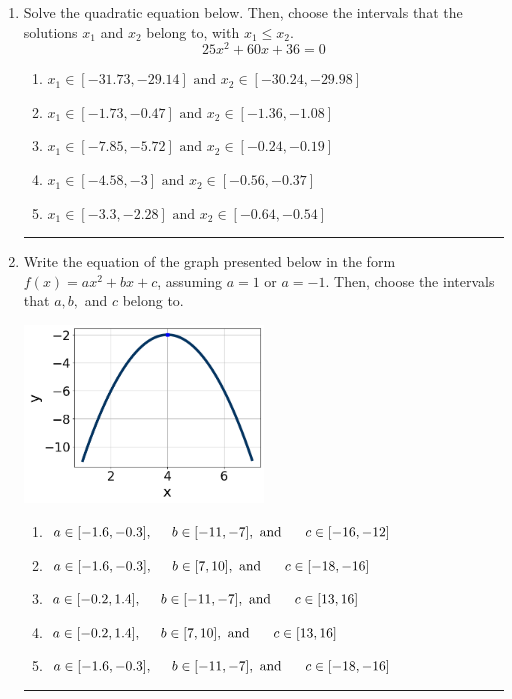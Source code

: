 \documentclass[14pt]{extbook}
\newcommand{\litem}[1]{\item#1\hspace*{-1cm}\rule{\textwidth}{0.4pt}}
\begin{document}
\begin{enumerate}
{\begin{enumerate}[label=\Alph*.]
\end{enumerate} }
\litem{
Solve the quadratic equation below. Then, choose the intervals that the solutions $x_1$ and $x_2$ belong to, with $x_1 \leq x_2$.\[ 25x^{2} +60 x + 36 = 0 \]\begin{enumerate}[label=\Alph*.]
\item \( x_1 \in [-31.73, -29.14] \text{ and } x_2 \in [-30.24, -29.98] \)
\item \( x_1 \in [-1.73, -0.47] \text{ and } x_2 \in [-1.36, -1.08] \)
\item \( x_1 \in [-7.85, -5.72] \text{ and } x_2 \in [-0.24, -0.19] \)
\item \( x_1 \in [-4.58, -3] \text{ and } x_2 \in [-0.56, -0.37] \)
\item \( x_1 \in [-3.3, -2.28] \text{ and } x_2 \in [-0.64, -0.54] \)

\end{enumerate} }
\litem{
Write the equation of the graph presented below in the form $f(x)=ax^2+bx+c$, assuming  $a=1$ or $a=-1$. Then, choose the intervals that $a, b,$ and $c$ belong to.
\begin{center}
    \includegraphics[width=0.5\textwidth]{../Figures/quadraticGraphToEquationCopyB.png}
\end{center}
\begin{enumerate}[label=\Alph*.]
\item \( a \in [-1.6, -0.3], \hspace*{5mm} b \in [-11, -7], \text{ and } \hspace*{5mm} c \in [-16, -12] \)
\item \( a \in [-1.6, -0.3], \hspace*{5mm} b \in [7, 10], \text{ and } \hspace*{5mm} c \in [-18, -16] \)
\item \( a \in [-0.2, 1.4], \hspace*{5mm} b \in [-11, -7], \text{ and } \hspace*{5mm} c \in [13, 16] \)
\item \( a \in [-0.2, 1.4], \hspace*{5mm} b \in [7, 10], \text{ and } \hspace*{5mm} c \in [13, 16] \)
\item \( a \in [-1.6, -0.3], \hspace*{5mm} b \in [-11, -7], \text{ and } \hspace*{5mm} c \in [-18, -16] \)


\end{enumerate}}
\end{enumerate}
\end{document}
